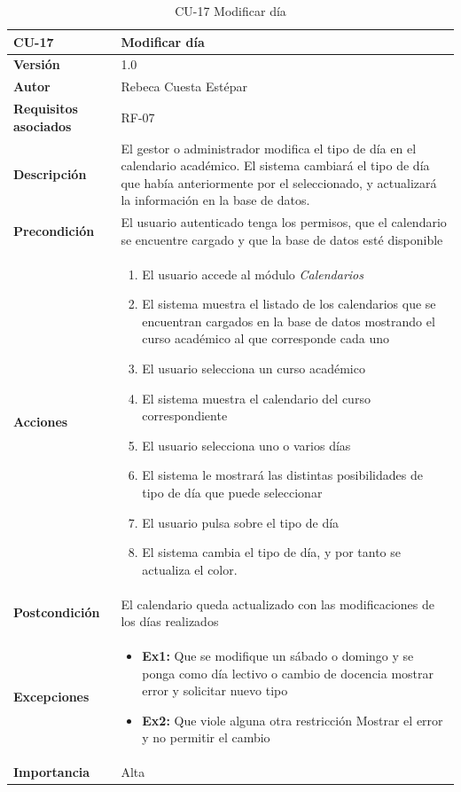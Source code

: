 \begin{table}[p]
	\centering
	\begin{tabularx}{\linewidth}{ p{} p{} }
		\toprule
		\textbf{CU-17}    & \textbf{Modificar día}\\
		\toprule
		\textbf{Versión}              & 1.0    \\
		\textbf{Autor}                & Rebeca Cuesta Estépar \\
		\textbf{Requisitos asociados} & RF-07 \\
		\textbf{Descripción}          & El gestor o administrador modifica el tipo de día en el calendario académico. El sistema cambiará el tipo de día que había anteriormente por el seleccionado, y actualizará la información en la base de datos. \\
		\textbf{Precondición}         &  El usuario autenticado tenga los permisos, que el calendario se encuentre cargado y que la base de datos esté disponible \\
		\textbf{Acciones}             &
		\begin{enumerate}
			\def\labelenumi{\arabic{enumi}.}
			\tightlist
			\item El usuario accede al módulo \emph{Calendarios}
			\item El sistema muestra el listado de los calendarios que se encuentran cargados en la base de datos mostrando el curso académico al que corresponde cada uno
			\item El usuario selecciona un curso académico
			\item El sistema muestra el calendario del curso correspondiente
			\item El usuario selecciona uno o varios días
			\item El sistema le mostrará las distintas posibilidades de tipo de día que puede seleccionar
			\item El usuario pulsa sobre el tipo de día
			\item El sistema cambia el tipo de día, y por tanto se actualiza el color.
		\end{enumerate}\\
		\textbf{Postcondición} & El calendario queda actualizado con las modificaciones de los días realizados\\
		\textbf{Excepciones}          &  
		\begin{itemize}
			\tightlist
			\item \textbf{Ex1:} Que se modifique un sábado o domingo y se ponga como día lectivo o cambio de docencia\textrightarrow{} mostrar error y solicitar nuevo tipo
			\item \textbf{Ex2:} Que viole alguna otra restricción \textrightarrow{} Mostrar el error y no permitir el cambio
		\end{itemize}\\
		\textbf{Importancia}          & Alta \\
		\bottomrule
	\end{tabularx}
	\caption{CU-17 Modificar día}
\end{table}

